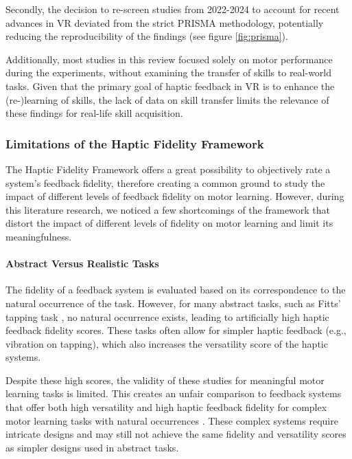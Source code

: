 Secondly, the decision to re-screen studies from 2022-2024 to account for recent advances in VR deviated from the strict PRISMA methodology, potentially reducing the reproducibility of the findings (see figure \ref{fig:prisma}).

Additionally, most studies in this review focused solely on motor performance during the experiments, without examining the transfer of skills to real-world tasks. Given that the primary goal of haptic feedback in VR is to enhance the (re-)learning of skills, the lack of data on skill transfer limits the relevance of these findings for real-life skill acquisition.


\subsubsection{Limitations of the Haptic Fidelity Framework}
The Haptic Fidelity Framework offers a great possibility to objectively rate a system's feedback fidelity, therefore creating a common ground to study the impact of different levels of feedback fidelity on motor learning. However, during this literature research, we noticed a few shortcomings of the framework that distort the impact of different levels of fidelity on motor learning and limit its meaningfulness.

\paragraph{Abstract Versus Realistic Tasks}
The fidelity of a feedback system is evaluated based on its correspondence to the natural occurrence of the task. However, for many abstract tasks, such as Fitts' tapping task \cite{Fitts1954TheMovement}, no natural occurrence exists, leading to artificially high haptic feedback fidelity scores. These tasks often allow for simpler haptic feedback (e.g., vibration on tapping), which also increases the versatility score of the haptic systems. 

Despite these high scores, the validity of these studies for meaningful motor learning tasks is limited. This creates an unfair comparison to feedback systems that offer both high versatility and high haptic feedback fidelity for complex motor learning tasks with natural occurrences \cite{LeeY2019, LiuH2019, Oezen2022}. These complex systems require intricate designs and may still not achieve the same fidelity and versatility scores as simpler designs used in abstract tasks.

